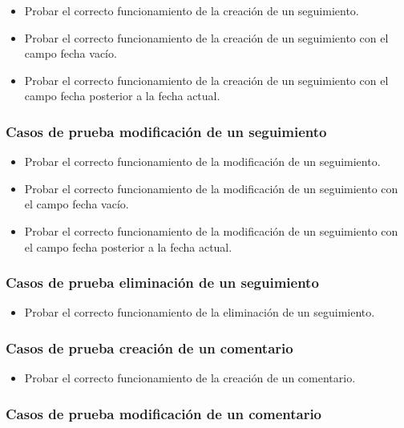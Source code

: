 \begin{itemize}
    \item Probar el correcto funcionamiento de la creación de un seguimiento.
    \item Probar el correcto funcionamiento de la creación de un seguimiento con el campo fecha vacío.
    \item Probar el correcto funcionamiento de la creación de un seguimiento con el campo fecha posterior a la fecha actual.
\end{itemize}

\subsubsection{Casos de prueba modificación de un seguimiento}

\begin{itemize}
    \item Probar el correcto funcionamiento de la modificación de un seguimiento.
    \item Probar el correcto funcionamiento de la modificación de un seguimiento con el campo fecha vacío.
    \item Probar el correcto funcionamiento de la modificación de un seguimiento con el campo fecha posterior a la fecha actual.
\end{itemize}

\subsubsection{Casos de prueba eliminación de un seguimiento}

\begin{itemize}
    \item Probar el correcto funcionamiento de la eliminación de un seguimiento.
\end{itemize}

\subsubsection{Casos de prueba creación de un comentario}

\begin{itemize}
    \item Probar el correcto funcionamiento de la creación de un comentario.
\end{itemize}

\subsubsection{Casos de prueba modificación de un comentario}

